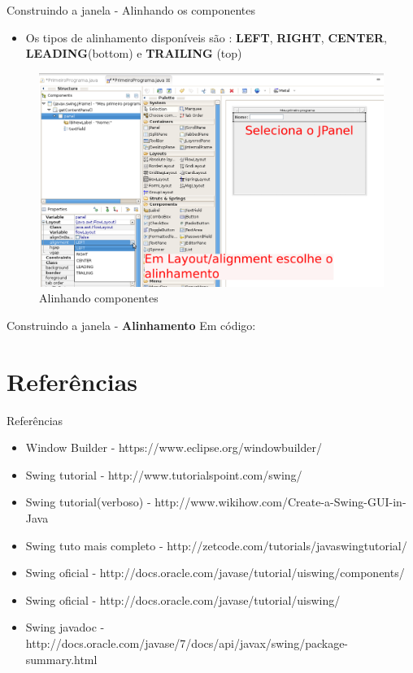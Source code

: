 \documentclass[10pt]{beamer}
\begin{document}
\begin{frame}{Construindo a janela - Alinhando os componentes}
\begin{itemize}
\item Os tipos de alinhamento disponíveis são : \textbf{LEFT}, \textbf{RIGHT}, \textbf{CENTER}, \textbf{LEADING}(bottom) e \textbf{TRAILING} (top)
\end{itemize}
\begin{figure}[!htb]
    \centering
    \includegraphics[scale=.25]{alinhando_a_esquerda}
    \caption{Alinhando componentes}
    \label{figRotulo}
  \end{figure}
\end{frame}{}

\begin{frame}{Construindo a janela - \textbf{Alinhamento}}
Em código:

\end{frame}{}



\section{Referências}
\begin{frame}{Referências}{}
\begin{itemize}
\item Window Builder - https://www.eclipse.org/windowbuilder/
\item Swing tutorial - http://www.tutorialspoint.com/swing/
\item Swing tutorial(verboso) - http://www.wikihow.com/Create-a-Swing-GUI-in-Java
\item Swing tuto mais completo - http://zetcode.com/tutorials/javaswingtutorial/
\item Swing oficial - http://docs.oracle.com/javase/tutorial/uiswing/components/
\item Swing oficial - http://docs.oracle.com/javase/tutorial/uiswing/
\item Swing javadoc - http://docs.oracle.com/javase/7/docs/api/javax/swing/package-summary.html
\end{itemize}
\end{frame}
\end{document}

